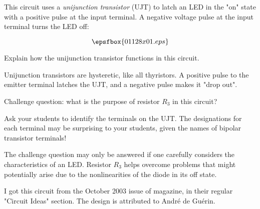 

This circuit uses a {\it unijunction transistor} (UJT) to latch an LED in the "on" state with a positive pulse at the input terminal.  A negative voltage pulse at the input terminal turns the LED off:

$$\epsfbox{01128x01.eps}$$

Explain how the unijunction transistor functions in this circuit. 







Unijunction transistors are hysteretic, like all thyristors.  A positive pulse to the emitter terminal latches the UJT, and a negative pulse makes it "drop out".

\vskip 10pt

Challenge question: what is the purpose of resistor $R_3$ in this circuit?







Ask your students to identify the terminals on the UJT.  The designations for each terminal may be surprising to your students, given the names of bipolar transistor terminals!

The challenge question may only be answered if one carefully considers the characteristics of an LED.  Resistor $R_3$ helps overcome problems that might potentially arise due to the nonlinearities of the diode in its off state.

I got this circuit from the October 2003 issue of  magazine, in their regular "Circuit Ideas" section.  The design is attributed to Andr\'e de Gu\'erin. 





